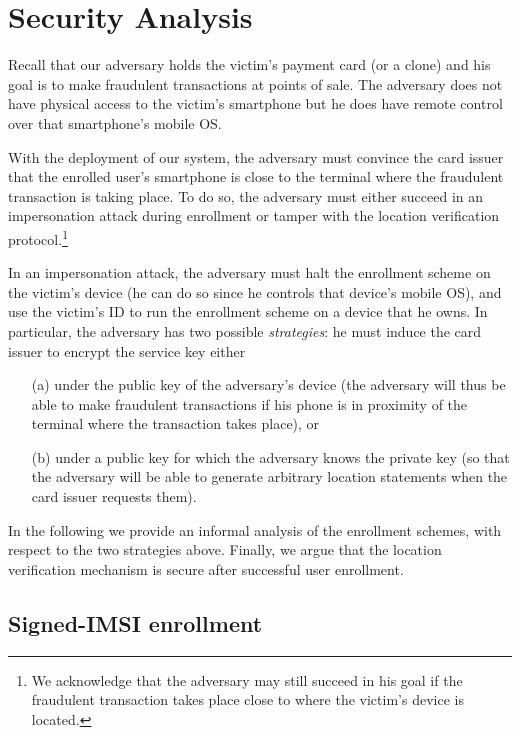 \section{Security Analysis}
\label{sec:ps_tee_analysis}
		
Recall that our adversary holds the victim's payment card (or a clone) and his
goal is to make fraudulent transactions at points of sale. The adversary does
not have physical access to the victim's smartphone but he does have remote
control over that smartphone's mobile OS.

With the deployment of our system, the adversary must convince the card issuer
that the enrolled user's smartphone is close to the terminal where the
fraudulent transaction is taking place. To do so, the adversary must either
succeed in an impersonation attack during enrollment or tamper with the location
verification protocol.\footnote{We acknowledge that the adversary may still
  succeed in his goal if the fraudulent transaction takes place close to where
  the victim's device is located.}

In an impersonation attack, the adversary must halt the enrollment scheme on the
victim's device (he can do so since he controls that device's mobile OS), and
use the victim's ID to run the enrollment scheme on a device that he owns. In
particular, the adversary has two possible \emph{strategies}: he must induce the
card issuer to encrypt the service key either

\begin{itemize}
\item[(a)] under the public key of the adversary's device (the adversary will
  thus be able to make fraudulent transactions if his phone is in proximity of
  the terminal where the transaction takes place), or
\item[(b)] under a public key for which the adversary knows the private key (so
  that the adversary will be able to generate arbitrary location statements when
  the card issuer requests them).
\end{itemize}

In the following we provide an informal analysis of the enrollment schemes, with
respect to the two strategies above. Finally, we argue that the location
verification mechanism is secure after successful user enrollment.

\subsection{Signed-IMSI enrollment}

